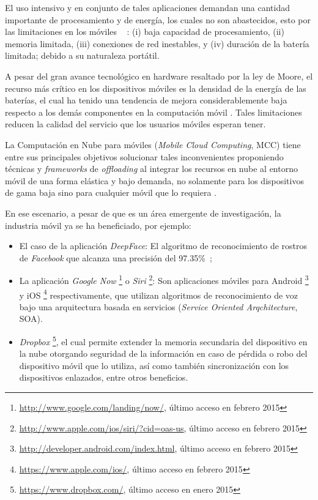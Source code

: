El uso intensivo y en conjunto de tales aplicaciones demandan una cantidad importante de procesamiento y de energía, los cuales 
no son abastecidos, esto por las limitaciones en los móviles ~\cite{6157576} : (i) baja capacidad de procesamiento, (ii) memoria limitada,
(iii) conexiones de red inestables, y (iv) duración de la batería limitada; debido a su naturaleza portátil. 

A pesar del gran avance tecnológico en hardware resaltado por la ley de Moore, el recurso más crítico en los dispositivos móviles 
es la densidad de la energía de las baterías, el cual ha tenido una tendencia de mejora considerablemente baja respecto a los demás 
componentes en la computación móvil \cite{1401839}. Tales limitaciones reducen la calidad del servicio 
que los usuarios móviles esperan tener.

La Computación en Nube para móviles (\textit{Mobile Cloud Computing}, MCC) tiene entre sus principales objetivos solucionar tales
inconvenientes proponiendo técnicas y \emph{frameworks} de \emph{offloading} al integrar los recursos en nube al entorno móvil de una
forma elástica y bajo demanda, no solamente para los dispositivos de gama baja sino para cualquier móvil que lo requiera \cite{6553297}. 

En ese escenario, a pesar de que es un área emergente de investigación, la industria móvil ya se ha beneficiado, por ejemplo: 
\begin{itemize}
\item El caso de la aplicación \emph{DeepFace}: El algoritmo de reconocimiento de rostros de \emph{Facebook} que alcanza una precisión del 97.35\%~\cite{taigman2014deepface}; 
\item La aplicación \emph{Google Now} \footnote{\url{http://www.google.com/landing/now/},  último acceso 
en febrero 2015} o \emph{Siri} \footnote{\url{http://www.apple.com/ios/siri/?cid=oas-us}, último acceso 
en febrero 2015 }: Son aplicaciones móviles para Android \footnote{\url{http://developer.android.com/index.html}, último acceso 
en febrero 2015} y iOS \footnote{\url{https://www.apple.com/ios/}, último acceso 
en febrero 2015} respectivamente, que utilizan algoritmos de 
reconocimiento de voz bajo una arquitectura basada en servicios (\textit{Service Oriented Arqchitecture}, SOA).
\item \emph{Dropbox} \footnote{\url{https://www.dropbox.com/}, último acceso en enero 2015},
el  cual permite extender la memoria secundaria del dispositivo en la nube otorgando seguridad de la información en caso de pérdida o robo del dispositivo móvil que lo utiliza, así como también sincronización con los dispositivos enlazados, entre otros beneficios. 
\end{itemize}

